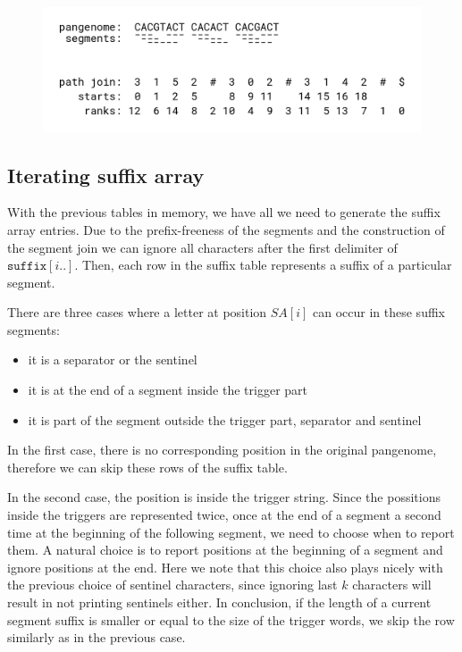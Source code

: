 \begin{figure}
    \centering
    \includegraphics[width=\linewidth]{images/path_join.png}
    \caption{}
    \label{fig:path_join}
\end{figure}



\subsection{Iterating suffix array}
With the previous tables in memory, we have all we need to generate the suffix
array entries.
Due to the prefix-freeness of the segments and the construction of the segment join
we can ignore all characters after the first delimiter of $\texttt{suffix}[i..]$.
Then, each row in the suffix table represents a suffix of a particular segment.


There are three cases where a letter at position $SA[i]$ can occur in these suffix segments:
\begin{itemize}
    \item it is a separator or the sentinel
    \item it is at the end of a segment inside the trigger part
    \item it is part of the segment outside the trigger part, separator and sentinel
\end{itemize}

In the first case, there is no corresponding position in the original pangenome,
therefore we can skip these rows of the suffix table.

In the second case, the position is inside the trigger string.
Since the possitions inside the triggers are represented twice, once at the end
of a segment a second time at the beginning of the following segment, we need
to choose when to report them.
A natural choice is to report positions at the beginning of a segment and ignore
positions at the end.
Here we note that this choice also plays nicely with the previous choice of sentinel
characters, since ignoring last $k$ characters will result in not printing
sentinels either.
In conclusion, if the length of a current segment suffix is smaller or equal to
the size of the trigger words, we skip the row similarly as in the previous case.

